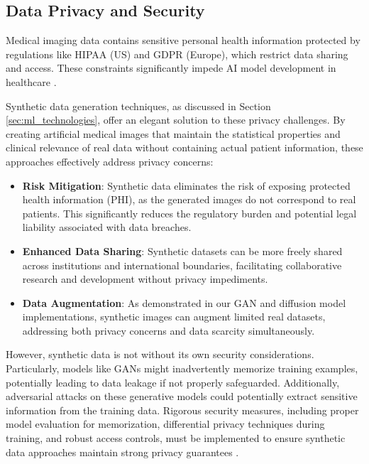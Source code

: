 \documentclass{article}
\begin{document}
\subsection{Data Privacy and Security}
Medical imaging data contains sensitive personal health information protected by regulations like HIPAA (US) and GDPR (Europe), which restrict data sharing and access. These constraints significantly impede AI model development in healthcare \cite{koetzierGeneratingSyntheticData2024}.

Synthetic data generation techniques, as discussed in Section \ref{sec:ml_technologies}, offer an elegant solution to these privacy challenges. By creating artificial medical images that maintain the statistical properties and clinical relevance of real data without containing actual patient information, these approaches effectively address privacy concerns:

\begin{itemize}
    \item \textbf{Risk Mitigation}: Synthetic data eliminates the risk of exposing protected health information (PHI), as the generated images do not correspond to real patients. This significantly reduces the regulatory burden and potential legal liability associated with data breaches.
    
    \item \textbf{Enhanced Data Sharing}: Synthetic datasets can be more freely shared across institutions and international boundaries, facilitating collaborative research and development without privacy impediments.
    
    \item \textbf{Data Augmentation}: As demonstrated in our GAN and diffusion model implementations, synthetic images can augment limited real datasets, addressing both privacy concerns and data scarcity simultaneously.
\end{itemize}

However, synthetic data is not without its own security considerations. Particularly, models like GANs might inadvertently memorize training examples, potentially leading to data leakage if not properly safeguarded. Additionally, adversarial attacks on these generative models could potentially extract sensitive information from the training data. Rigorous security measures, including proper model evaluation for memorization, differential privacy techniques during training, and robust access controls, must be implemented to ensure synthetic data approaches maintain strong privacy guarantees \cite{koetzierGeneratingSyntheticData2024}.
\end{document}
